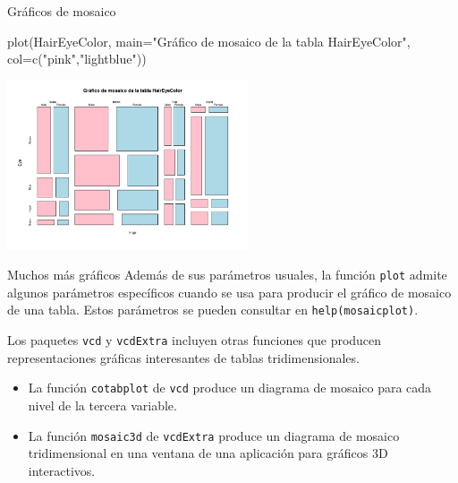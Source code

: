 \documentclass[
  ignorenonframetext,
  aspectratio=169]{beamer}
\newenvironment{Shaded}{\begin{snugshade}}{\end{snugshade}}
\newcommand{\AttributeTok}[1]{\textcolor[rgb]{0.77,0.63,0.00}{#1}}
\newcommand{\FunctionTok}[1]{\textcolor[rgb]{0.00,0.00,0.00}{#1}}
\newcommand{\NormalTok}[1]{#1}
\newcommand{\StringTok}[1]{\textcolor[rgb]{0.31,0.60,0.02}{#1}}
\providecommand{\tightlist}{%
  \setlength{\itemsep}{0pt}\setlength{\parskip}{0pt}}
\begin{document}
\begin{frame}[fragile]{Gráficos de mosaico}
\protect\hypertarget{gruxe1ficos-de-mosaico-3}{}
\begin{Shaded}
\begin{Highlighting}[]
\FunctionTok{plot}\NormalTok{(HairEyeColor, }\AttributeTok{main=}\StringTok{"Gráfico de mosaico de la tabla HairEyeColor"}\NormalTok{, }
     \AttributeTok{col=}\FunctionTok{c}\NormalTok{(}\StringTok{"pink"}\NormalTok{,}\StringTok{"lightblue"}\NormalTok{))}
\end{Highlighting}
\end{Shaded}

\begin{center}\includegraphics[width=270px]{Hora3_files/figure-beamer/unnamed-chunk-42-1} \end{center}
\end{frame}

\begin{frame}[fragile]{Muchos más gráficos}
\protect\hypertarget{muchos-muxe1s-gruxe1ficos}{}
Además de sus parámetros usuales, la función \texttt{plot} admite
algunos parámetros específicos cuando se usa para producir el gráfico de
mosaico de una tabla. Estos parámetros se pueden consultar en
\texttt{help(mosaicplot)}.

Los paquetes \texttt{vcd} y \texttt{vcdExtra} incluyen otras funciones
que producen representaciones gráficas interesantes de tablas
tridimensionales.

\begin{itemize}
\tightlist
\item
  La función \texttt{cotabplot} de \texttt{vcd} produce un diagrama de
  mosaico para cada nivel de la tercera variable.
\item
  La función \texttt{mosaic3d} de \texttt{vcdExtra} produce un diagrama
  de mosaico tridimensional en una ventana de una aplicación para
  gráficos 3D interactivos.
\end{itemize}
\end{frame}
\end{document}
